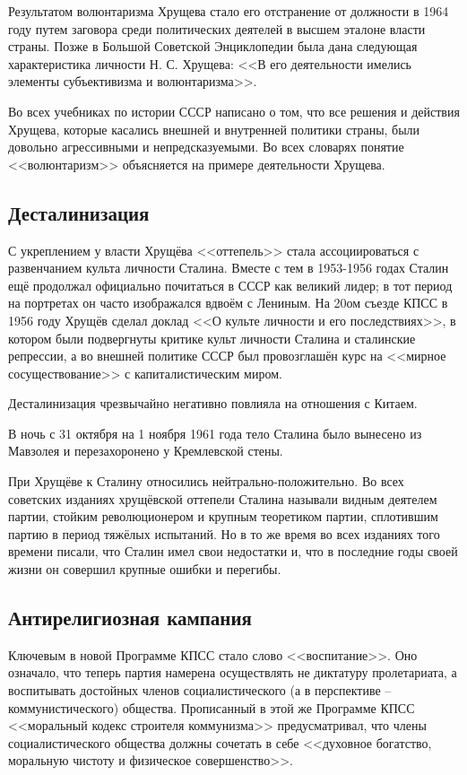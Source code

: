 \documentclass[12pt]{article}
\begin{document}
  Результатом волюнтаризма Хрущева стало его отстранение от должности в 1964 году путем заговора среди политических деятелей в высшем эталоне власти страны.
  Позже в Большой Советской Энциклопедии была дана следующая характеристика личности Н. С. Хрущева:
  <<В его деятельности имелись элементы субъективизма и волюнтаризма>>.

  Во всех учебниках по истории СССР написано о том, что все решения и действия Хрущева,
  которые касались внешней и внутренней политики страны, были довольно агрессивными и непредсказуемыми.
  Во всех словарях понятие <<волюнтаризм>> объясняется на примере деятельности Хрущева.

  \subsection{Десталинизация}
  С укреплением у власти Хрущёва <<оттепель>> стала ассоциироваться с развенчанием культа личности Сталина.
  Вместе с тем в 1953-1956 годах Сталин ещё продолжал официально почитаться в СССР как великий лидер;
  в тот период на портретах он часто изображался вдвоём с Лениным.
  На 20ом съезде КПСС в 1956 году Хрущёв сделал доклад <<О культе личности и его последствиях>>,
  в котором были подвергнуты критике культ личности Сталина и сталинские репрессии,
  а во внешней политике СССР был провозглашён курс на <<мирное сосуществование>> с капиталистическим миром.

  Десталинизация чрезвычайно негативно повлияла на отношения с Китаем.

  В ночь с 31 октября на 1 ноября 1961 года тело Сталина было вынесено из Мавзолея и перезахоронено у Кремлевской стены.

  При Хрущёве к Сталину относились нейтрально-положительно.
  Во всех советских изданиях хрущёвской оттепели Сталина называли видным деятелем партии,
  стойким революционером и крупным теоретиком партии, сплотившим партию в период тяжёлых испытаний.
  Но в то же время во всех изданиях того времени писали, что Сталин имел свои недостатки и,
  что в последние годы своей жизни он совершил крупные ошибки и перегибы.

  \subsection{Антирелигиозная кампания}
  Ключевым в новой Программе КПСС стало слово <<воспитание>>.
  Оно означало, что теперь партия намерена осуществлять не диктатуру пролетариата,
  а воспитывать достойных членов социалистического (а в перспективе -- коммунистического) общества.
  Прописанный в этой же Программе КПСС <<моральный кодекс строителя коммунизма>> предусматривал,
  что члены социалистического общества должны сочетать в себе <<духовное богатство, моральную чистоту и физическое совершенство>>.
\end{document}
